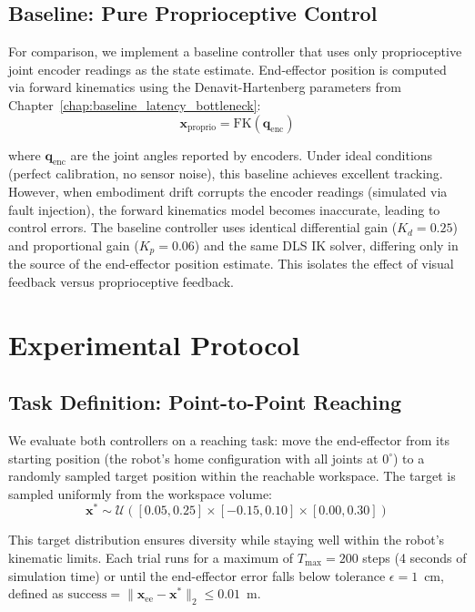 \documentclass[12pt,a4paper,oneside]{report}
\begin{document}
\subsection{Baseline: Pure Proprioceptive Control}
\label{subsec:baseline_pure_proprioceptive_control}

For comparison, we implement a baseline controller that uses only proprioceptive joint encoder readings as the state estimate. End-effector position is computed via forward kinematics using the Denavit-Hartenberg parameters from Chapter~\ref{chap:baseline_latency_bottleneck}:
\begin{equation}\mathbf{x}_{\text{proprio}} = \text{FK}(\mathbf{q}_{\text{enc}})
\end{equation}

where $\mathbf{q}_{\text{enc}}$ are the joint angles reported by encoders. Under ideal conditions (perfect calibration, no sensor noise), this baseline achieves excellent tracking. However, when embodiment drift corrupts the encoder readings (simulated via fault injection), the forward kinematics model becomes inaccurate, leading to control errors. The baseline controller uses identical differential gain ($K_d = 0.25$) and proportional gain ($K_p = 0.06$) and the same DLS IK solver, differing only in the source of the end-effector position estimate. This isolates the effect of visual feedback versus proprioceptive feedback.
\section{Experimental Protocol}
\subsection{Task Definition: Point-to-Point Reaching}
\label{subsec:task_definition_point_to_point_reaching}

We evaluate both controllers on a reaching task: move the end-effector from its starting position (the robot's home configuration with all joints at $0^\circ$) to a randomly sampled target position within the reachable workspace. The target is sampled uniformly from the workspace volume:
\begin{equation}\mathbf{x}^* \sim \mathcal{U}([0.05, 0.25] \times [-0.15, 0.10] \times [0.00, 0.30])
\end{equation}

This target distribution ensures diversity while staying well within the robot's kinematic limits. Each trial runs for a maximum of $T_{\text{max}} = 200$ steps (4 seconds of simulation time) or until the end-effector error falls below tolerance $\epsilon = 1$~cm, defined as $\text{success} = \|\mathbf{x}_{\text{ee}} - \mathbf{x}^*\|_2 \leq 0.01$~m.
\end{document}
